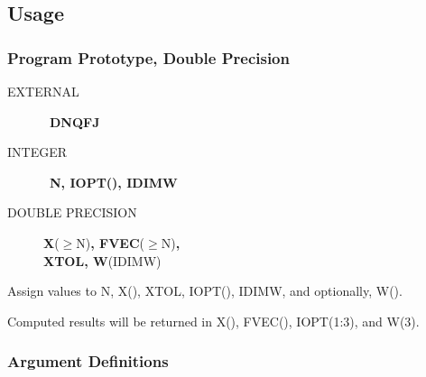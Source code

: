 \documentclass[twoside]{MATH77}
\begin{document}
\subsection{Usage}

\subsubsection{Program Prototype, Double Precision}
\begin{description}
\item[EXTERNAL]  \ {\bf DNQFJ}

\item[INTEGER]  \ {\bf N, IOPT(), IDIMW}

\item[DOUBLE PRECISION]  {\bf X}($\geq $N){\bf , FVEC}($\geq $N){\bf ,\\
XTOL, W}(IDIMW)
\end{description}
Assign values to N, X(), XTOL, IOPT(), IDIMW, and optionally, W().
\begin{center}
\end{center}
Computed results will be returned in X(), FVEC(), IOPT(1:3), and W(3).

\subsubsection{Argument Definitions}
\end{document}
